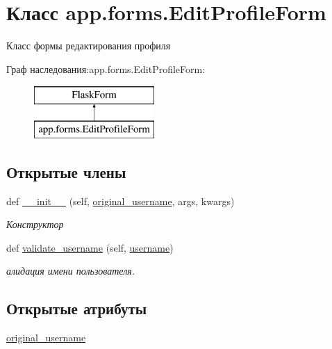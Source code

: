\hypertarget{classapp_1_1forms_1_1_edit_profile_form}{}\section{Класс app.\+forms.\+Edit\+Profile\+Form}
\label{classapp_1_1forms_1_1_edit_profile_form}


Класс формы редактирования профиля  


Граф наследования\+:app.\+forms.\+Edit\+Profile\+Form\+:\begin{figure}[H]
\begin{center}
\leavevmode
\includegraphics[height=2.000000cm]{classapp_1_1forms_1_1_edit_profile_form}
\end{center}
\end{figure}
\subsection*{Открытые члены}
\begin{DoxyCompactItemize}
\item 
def \mbox{\hyperlink{classapp_1_1forms_1_1_edit_profile_form_ac6fcb8c475148a0190fe489e61e33101}{\+\_\+\+\_\+init\+\_\+\+\_\+}} (self, \mbox{\hyperlink{classapp_1_1forms_1_1_edit_profile_form_a780b5da2adfe5fd308f3e49e83ad343f}{original\+\_\+username}}, args, kwargs)
\begin{DoxyCompactList}\small\item\em Конструктор \end{DoxyCompactList}\item 
def \mbox{\hyperlink{classapp_1_1forms_1_1_edit_profile_form_ae6dab7354d6ef7902de30f80b3fdbdfb}{validate\+\_\+username}} (self, \mbox{\hyperlink{classapp_1_1forms_1_1_edit_profile_form_a57b60e620c9d09de0968b3e456039612}{username}})
\begin{DoxyCompactList}\small\item\em алидация имени пользователя. \end{DoxyCompactList}\end{DoxyCompactItemize}
\subsection*{Открытые атрибуты}
\begin{DoxyCompactItemize}
\item 
\mbox{\hyperlink{classapp_1_1forms_1_1_edit_profile_form_a780b5da2adfe5fd308f3e49e83ad343f}{original\+\_\+username}}
\end{DoxyCompactItemize}

